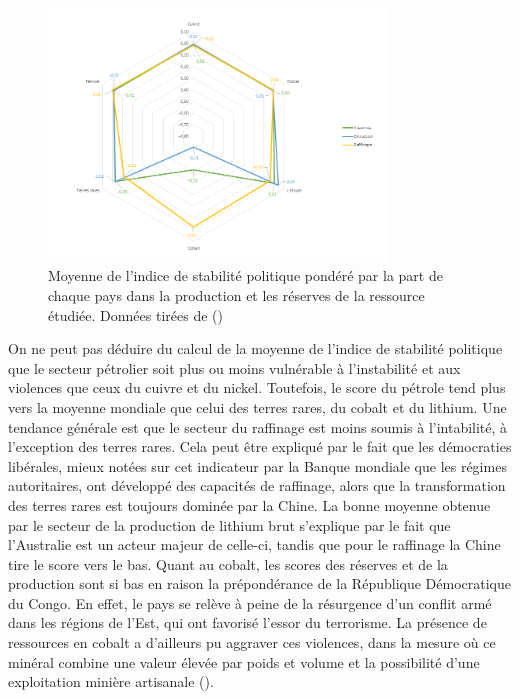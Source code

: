 \begin{figure}
    \centering
    \includegraphics[width=0.8\textwidth]{Images/02 appro/graphe gouvernance.png}
    \caption{Moyenne de l'indice de stabilité politique pondéré par la part de chaque pays dans la production et les réserves de la ressource étudiée. Données tirées de (\cite{world_bank_wgi_2023})}
    \label{fig:Polit World Bank}
\end{figure}
On ne peut pas déduire du calcul de la moyenne de l'indice de stabilité politique que le secteur pétrolier soit plus ou moins vulnérable à l'instabilité et aux violences que ceux du cuivre et du nickel. Toutefois, le score du pétrole tend plus vers la moyenne mondiale que celui des terres rares, du cobalt et du lithium. Une tendance générale est que le secteur du raffinage est moins soumis à l'intabilité, à l'exception des terres rares. Cela peut être expliqué par le fait que les démocraties libérales, mieux notées sur cet indicateur par la Banque mondiale que les régimes autoritaires, ont développé des capacités de raffinage, alors que la transformation des terres rares est toujours dominée par la Chine. La bonne moyenne obtenue par le secteur de la production de lithium brut s'explique par le fait que l'Australie est un acteur majeur de celle-ci, tandis que pour le raffinage la Chine tire le score vers le bas. Quant au cobalt, les scores des réserves et de la production sont si bas en raison la prépondérance de la République Démocratique du Congo. En effet, le pays se relève à peine de la résurgence d'un conflit armé dans les régions de l'Est, qui ont favorisé l'essor du terrorisme. La présence de ressources en cobalt a d'ailleurs pu aggraver ces violences, dans la mesure où ce minéral combine une valeur élevée par poids et volume et la possibilité d'une exploitation minière artisanale (\cite{manberger_geopolitics_2019}).
